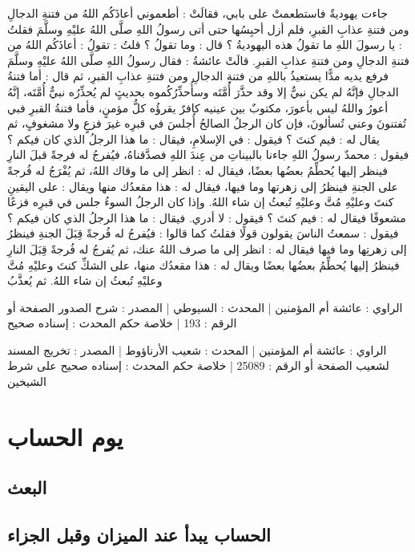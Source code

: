 جاءت يهوديةٌ فاستطعمتْ على بابي، فقالَتْ : أطعموني أعاذَكُم اللهُ من فتنةِ الدجالِ ومن فتنةِ عذابِ القبرِ، فلم أزل أحبِسُها حتى أتى رسولُ اللهِ صلَّى اللهُ عليْهِ وسلَّمَ فقلتُ : يا رسولَ اللهِ ما تقولُ هذه اليهوديةُ ؟ قال : وما تقولُ ؟ قلتُ : تقولُ : أعاذَكُم اللهُ من فتنةِ الدجالِ ومن فتنةِ عذابِ القبرِ. قالَتْ عائشةُ : فقال رسولُ اللهِ صلَّى اللهُ عليْهِ وسلَّمَ فرفع يديه مدًّا يستعيذُ باللهِ من فتنةِ الدجالِ ومن فتنةِ عذابِ القبرِ، ثم قال : أما فتنةُ الدجالِ فإنَّهُ لم يكن نبيٌّ إلا وقد حذَّرَ أُمَّتَه وسأُحذِّرُكُموه بحديثٍ لم يُحذِّرُه نبيٌّ أُمَّتَه، إنَّهُ أعورُ واللهُ ليس بأعورَ، مكتوبٌ بين عينيه كافرٌ يقرؤُه كلُّ مؤمنٍ، فأما فتنةُ القبرِ فبي تُفتنونَ وعني تُسألونَ، فإن كان الرجلُ الصالحُ أُجلسَ في قبرِه غيرَ فزعٍ ولا مشغوفٍ، ثم يقال له : فيم كنتَ ؟ فيقول : في الإسلامِ، فيقال : ما هذا الرجلُ الذي كان فيكم ؟ فيقول : محمدٌ رسولُ اللهِ جاءنا بالبيناتِ من عِندَ اللهِ فصدَّقناهُ، فيُفرجُ له فرجةً قبلَ النارِ فينظر إليها يُحطِّمُ بعضُها بعضًا، فيقال له : انظر إلى ما وقاك اللهُ، ثم يُفْرَجُ له فُرجةً على الجنةِ فينظرُ إلى زهرتها وما فيها، فيقال له : هذا مقعدُك منها ويقال : على اليقينِ كنتَ وعليْهِ مُتَّ وعليْهِ تُبعثُ إن شاء اللهُ. وإذا كان الرجلُ السوءُ جلس في قبرِه فزعًا مشعوفًا فيقال له : فيم كنتَ ؟ فيقول : لا أدري. فيقال : ما هذا الرجلُ الذي كان فيكم ؟ فيقول : سمعتُ الناسَ يقولون قولًا فقلتُ كما قالوا : فيُفرجُ له فُرجةً قِبَلَ الجنةِ فينظرُ إلى زهرتِها وما فيها فيقال له : انظر إلى ما صرف اللهُ عنك، ثم يُفرجُ له فُرجةً قِبَلَ النارِ فينظرُ إليها يُحطِّمُ بعضُها بعضًا ويقال له : هذا مقعدُك منها، على الشكِّ كنتَ وعليْهِ مُتَّ وعليْهِ تُبعثُ إن شاء اللهُ. ثم يُعذَّبُ

الراوي : عائشة أم المؤمنين | المحدث : السيوطي | المصدر : شرح الصدور
الصفحة أو الرقم : 193 | خلاصة حكم المحدث : إسناده صحيح 

الراوي : عائشة أم المؤمنين | المحدث : شعيب الأرناؤوط | المصدر : تخريج المسند لشعيب
الصفحة أو الرقم : 25089 | خلاصة حكم المحدث : إسناده صحيح على شرط الشيخين 

\section{يوم الحساب}

\subsection{البعث}


\subsection{الحساب يبدأ عند الميزان وقبل الجزاء}


